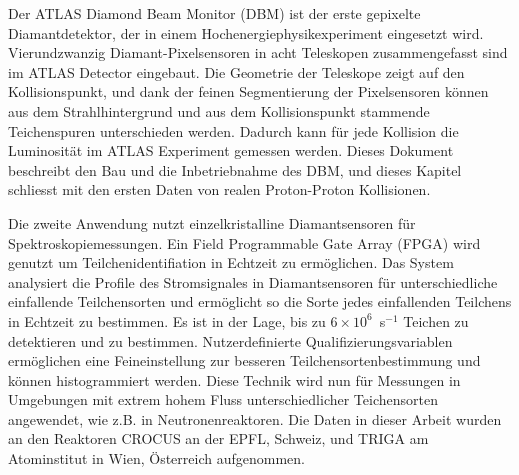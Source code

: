 \begin{abstractger}
Der ATLAS Diamond Beam Monitor (DBM) ist der erste gepixelte Diamantdetektor, der in einem Hochenergiephysikexperiment eingesetzt wird. Vierundzwanzig Diamant-Pixelsensoren in acht Teleskopen zusammengefasst sind im ATLAS Detector eingebaut. Die Geometrie der Teleskope zeigt auf den Kollisionspunkt, und dank der feinen Segmentierung der Pixelsensoren k\"onnen aus dem Strahlhintergrund und aus dem Kollisionspunkt stammende Teichenspuren unterschieden werden. Dadurch kann f\"ur jede Kollision die Luminosit\"at im ATLAS Experiment gemessen werden. Dieses Dokument beschreibt den Bau und die Inbetriebnahme des DBM, und dieses Kapitel schliesst mit den ersten Daten von realen Proton-Proton Kollisionen.

Die zweite Anwendung nutzt einzelkristalline Diamantsensoren f\"ur Spektroskopiemessungen. Ein Field Programmable Gate Array (FPGA) wird genutzt um Teilchenidentifiation in Echtzeit zu erm\"oglichen. Das System analysiert die Profile des Stromsignales in Diamantsensoren f\"ur unterschiedliche einfallende Teilchensorten und erm\"oglicht so die Sorte jedes einfallenden Teilchens in Echtzeit zu bestimmen. Es ist in der Lage, bis zu $6\times10^6$~s$^{-1}$ Teichen zu detektieren und zu bestimmen. Nutzerdefinierte Qualifizierungsvariablen erm\"oglichen eine Feineinstellung zur besseren Teilchensortenbestimmung und k\"onnen histogrammiert werden. Diese Technik wird nun f\"ur Messungen in Umgebungen mit extrem hohem Fluss unterschiedlicher Teichensorten angewendet, wie z.B. in Neutronenreaktoren. Die Daten in dieser Arbeit wurden an den Reaktoren CROCUS an der EPFL, Schweiz, und TRIGA am Atominstitut in Wien, \"Osterreich aufgenommen.
\end{abstractger}